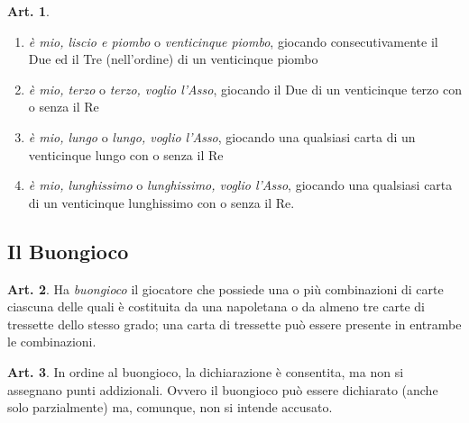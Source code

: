 \documentclass[italian,a4paper]{book}
\theoremstyle{definition}
\newtheorem{art}{Art.}
\newenvironment{packedenum}{
\begin{enumerate}
  \setlength{\itemsep}{1pt}
  \setlength{\parskip}{0pt}
  \setlength{\parsep}{0pt}
}{\end{enumerate}}
\begin{document}
\begin{art}
\begin{packedenum}
\item \emph{è mio, liscio e piombo} o \emph{venticinque piombo},  giocando consecutivamente il Due ed il Tre (nell'ordine) di un venticinque piombo
\item \emph{è mio, terzo} o \emph{terzo, voglio l'Asso},  giocando il Due di un venticinque terzo con o senza il Re
\item \emph{è mio, lungo} o \emph{lungo, voglio l'Asso},  giocando una qualsiasi carta di un venticinque lungo con o senza il Re
\item \emph{è mio, lunghissimo} o \emph{lunghissimo, voglio l'Asso},  giocando una qualsiasi carta di un venticinque lunghissimo con o senza il Re.
\end{packedenum}
\end{art}
\subsection{Il Buongioco}
\begin{art}
    Ha \emph{buongioco} il giocatore che possiede una o più combinazioni di carte ciascuna delle quali è costituita da una napoletana o da almeno tre carte di tressette dello stesso grado; una carta di tressette può essere presente in entrambe le combinazioni.
\end{art}
\begin{art}
In ordine al buongioco, la dichiarazione è consentita, ma non si assegnano
punti addizionali. Ovvero il buongioco
può essere dichiarato (anche solo parzialmente) ma, comunque, non si intende
accusato.
\end{art}
\end{document}
